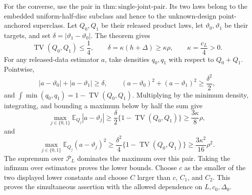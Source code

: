 For the converse, use the pair in \(\mathrm{thm:single\text{-}joint\text{-}pair}\).  Its two laws belong to the embedded uniform-half-disc subclass and hence to the unknown-design point-anchored superclass.  Let \(Q_0,Q_1\) be their released product laws, let \(\vartheta_0,\vartheta_1\) be their targets, and set \(\delta=|\vartheta_1-\vartheta_0|\).  The theorem gives
\[
 \operatorname{TV}(Q_0,Q_1)\leq\frac14,
 \qquad
 \delta=\kappa(h+\Delta)\geq\kappa\rho,
 \qquad \kappa=\frac{c_L}{4}>0.
\]
For any released-data estimator \(a\), take densities \(q_0,q_1\) with respect to \(Q_0+Q_1\).  Pointwise,
\[
 |a-\vartheta_0|+|a-\vartheta_1|\geq\delta,
 \qquad
 (a-\vartheta_0)^2+(a-\vartheta_1)^2\geq\frac{\delta^2}{2},
\]
and \(\int\min(q_0,q_1)=1-\operatorname{TV}(Q_0,Q_1)\).  Multiplying by the minimum density, integrating, and bounding a maximum below by half the sum give
\[
 \max_{j\in\{0,1\}}\mathbb E_{Q_j}|a-\vartheta_j|
 \geq\frac\delta2\{1-\operatorname{TV}(Q_0,Q_1)\}
 \geq\frac{3\kappa}{8}\rho,
\]
and
\[
 \max_{j\in\{0,1\}}\mathbb E_{Q_j}(a-\vartheta_j)^2
 \geq\frac{\delta^2}{4}\{1-\operatorname{TV}(Q_0,Q_1)\}
 \geq\frac{3\kappa^2}{16}\rho^2.
\]
The supremum over \(\mathcal P_L\) dominates the maximum over this pair.  Taking the infimum over estimators proves the lower bounds.  Choose \(c\) as the smaller of the two displayed lower constants and choose \(C\) larger than \(c\), \(C_1\), and \(C_2\).  This proves the simultaneous assertion with the allowed dependence on \(L,c_0,\Delta_0\).